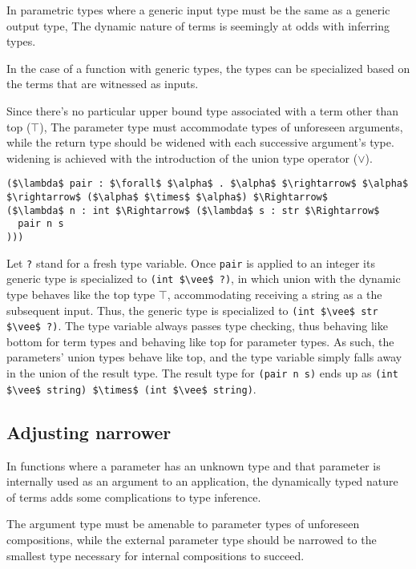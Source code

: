 \documentclass[manuscript]{acmart}
\begin{document}
In parametric types where a generic input type must be the same as a generic output type,
The dynamic nature of terms is seemingly at odds with inferring types.

In the case of a function with generic types, 
the types can be specialized based on the terms that are witnessed as inputs. 

Since there's no particular upper bound type associated with 
a term other than top ($\top$), 
The parameter type must accommodate types of unforeseen arguments, 
while the return type should be widened with each successive
argument's type.
widening is achieved with the introduction of the union type operator ($\vee$).

\begin{lstlisting}
($\lambda$ pair : $\forall$ $\alpha$ . $\alpha$ $\rightarrow$ $\alpha$ $\rightarrow$ ($\alpha$ $\times$ $\alpha$) $\Rightarrow$ 
($\lambda$ n : int $\Rightarrow$ ($\lambda$ s : str $\Rightarrow$ 
  pair n s
)))
\end{lstlisting}

Let \lstinline{?} stand for a fresh type variable.
Once \lstinline{pair} is applied to an integer its generic type is specialized to 
\lstinline{(int $\vee$ ?)}, 
in which union with the dynamic type behaves like the top type $\top$, 
accommodating receiving a string as a the subsequent input.
Thus, the generic type is specialized to 
\newline
\lstinline{(int $\vee$ str $\vee$ ?)}.
The type variable always passes type checking, 
thus behaving like bottom for term types
and behaving like top for parameter types.
As such, the parameters' union types behave like top,
and the type variable simply falls away in the union of the result type. 
The result type for \lstinline{(pair n s)} ends up as 
\newline
\lstinline{(int $\vee$ string) $\times$ (int $\vee$ string)}. 

\subsection{Adjusting narrower}

In functions where a parameter has an unknown type and that parameter is 
internally used as an argument to an application, the dynamically typed 
nature of terms adds some complications to type inference.

The argument type must be amenable to parameter types 
of unforeseen compositions,
while the external parameter type should be narrowed 
to the smallest type necessary for internal compositions to
succeed.
\end{document}
